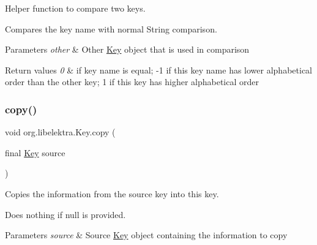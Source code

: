 Helper function to compare two keys. 

Compares the key name with normal String comparison.


\begin{DoxyParams}{Parameters}
{\em other} & Other \hyperlink{classorg_1_1libelektra_1_1Key}{Key} object that is used in comparison \\
\hline
\end{DoxyParams}

\begin{DoxyRetVals}{Return values}
{\em 0} & if key name is equal; -\/1 if this key name has lower alphabetical order than the other key; 1 if this key has higher alphabetical order \\
\hline
\end{DoxyRetVals}
\mbox{\label{classorg_1_1libelektra_1_1Key_abe0bb2790e29c52c12fec86a73818626}} 
\subsubsection{\texorpdfstring{copy()}{copy()}}
{\footnotesize\ttfamily void org.\+libelektra.\+Key.\+copy (\begin{DoxyParamCaption}\item[{final \hyperlink{classorg_1_1libelektra_1_1Key}{Key}}]{source }\end{DoxyParamCaption})\hspace{0.3cm}{\ttfamily [inline]}}



Copies the information from the source key into this key. 

Does nothing if null is provided.


\begin{DoxyParams}{Parameters}
{\em source} & Source \hyperlink{classorg_1_1libelektra_1_1Key}{Key} object containing the information to copy \\
\hline
\end{DoxyParams}
\mbox{\label{classorg_1_1libelektra_1_1Key_a9483ae832c9c16e4d68ed1c26babe2ce}} 
